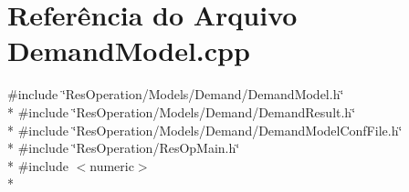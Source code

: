 \section{Referência do Arquivo Demand\+Model.\+cpp}
\label{_demand_model_8cpp}
{\ttfamily \#include \char`\"{}Res\+Operation/\+Models/\+Demand/\+Demand\+Model.\+h\char`\"{}}\\*
{\ttfamily \#include \char`\"{}Res\+Operation/\+Models/\+Demand/\+Demand\+Result.\+h\char`\"{}}\\*
{\ttfamily \#include \char`\"{}Res\+Operation/\+Models/\+Demand/\+Demand\+Model\+Conf\+File.\+h\char`\"{}}\\*
{\ttfamily \#include \char`\"{}Res\+Operation/\+Res\+Op\+Main.\+h\char`\"{}}\\*
{\ttfamily \#include $<$numeric$>$}\\*
